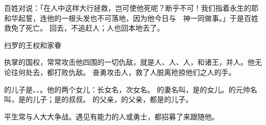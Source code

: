 {百姓对{}说：「{}在{}人中这样大行拯救，岂可使他死呢？断乎不可！我们指着永生的耶和华起誓，连他的一根头发也不可落地，因为他今日与　神一同做事。」于是百姓救{}免了死亡。
回去，不追赶{}人；{}人也回本地去了。
\par }{\SH 扫罗的王权和家眷
\par }{\PP {}执掌{}的国权，常常攻击他四围的一切仇敌，就是{}人、{}人、{}人，和{}诸王，并{}人。他无论往何处去，都打败仇敌。
奋勇攻击{}人，救了{}人脱离抢掠他们之人的手。
\par }{\PP {}的儿子是{}、{}、{}。他的两个女儿：长女名{}，次女名{}。
的妻名叫{}，是{}的女儿。{}的元帅名叫{}，是{}的儿子；{}是{}的叔叔。
的父亲{}，{}的父亲{}，都是{}的儿子。
\par }{\PP {}平生常与{}人大大争战。{}遇见有能力的人或勇士，都招募了来跟随他。

}
